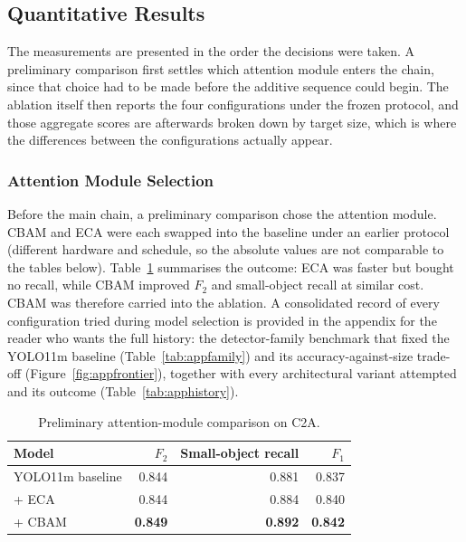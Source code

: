 \subsection{Quantitative Results}
\label{sec:quant}

The measurements are presented in the order the decisions were taken. A
preliminary comparison first settles which attention module enters the chain,
since that choice had to be made before the additive sequence could begin. The
ablation itself then reports the four configurations under the frozen protocol,
and those aggregate scores are afterwards broken down by target size, which is
where the differences between the configurations actually appear.

\subsubsection{Attention Module Selection}
Before the main chain, a preliminary comparison chose the attention module.
CBAM and ECA were each swapped into the baseline under an earlier protocol
(different hardware and schedule, so the absolute values are not comparable
to the tables below). Table~\ref{tab:eca} summarises the outcome: ECA was
faster but bought no recall, while CBAM improved $F_2$ and small-object
recall at similar cost. CBAM was therefore carried into the ablation. A
consolidated record of every configuration tried during model selection is
provided in the appendix for the reader who wants the full history: the
detector-family benchmark that fixed the YOLO11m baseline
(Table~\ref{tab:appfamily}) and its accuracy-against-size trade-off
(Figure~\ref{fig:appfrontier}), together with every architectural variant
attempted and its outcome (Table~\ref{tab:apphistory}).

\begin{table}[tbp]
  \centering
  \caption{Preliminary attention-module comparison on C2A.}
  \label{tab:eca}
  \begin{tabular}{|l|r|r|r|}
    \hline
    Model & $F_2$ & Small-object recall & $F_1$ \\
    \hline
    YOLO11m baseline & 0.844 & 0.881 & 0.837 \\ \hline
    + ECA            & 0.844 & 0.884 & 0.840 \\ \hline
    + CBAM           & \textbf{0.849} & \textbf{0.892} & \textbf{0.842} \\
    \hline
  \end{tabular}
\end{table}

